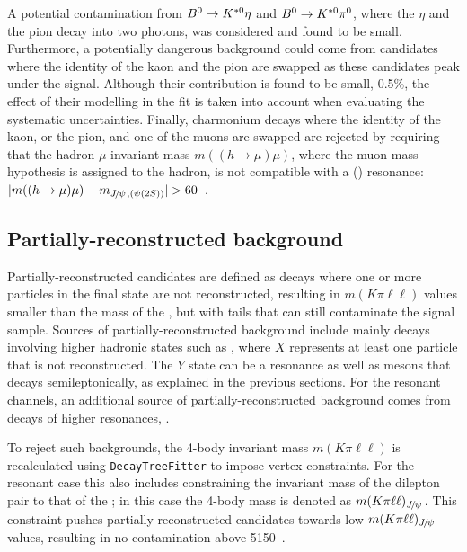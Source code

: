 A potential contamination from $\Bz \to\Kstarz\eta$ and $\Bz \to\Kstarz\pi^0$, where the $\eta$ and the pion decay into
two photons, was considered and found to be small.
Furthermore, a potentially dangerous background could come from candidates where the
identity of the kaon and the pion are swapped as these candidates peak under the signal.
Although their contribution is found to be small, 0.5\%, the effect of their modelling in the fit
is taken into account when evaluating the systematic uncertainties. Finally, charmonium decays where 
the identity of the kaon, or the pion, and one of the muons  are swapped are rejected by requiring that the 
hadron-$\mu$ invariant mass \mbox{$m((h \to \mu)\mu)$}, where the muon mass hypothesis is assigned to the hadron, 
is not compatible with a \jpsi (\psitwos) resonance: $|m((h\to \mu)\mu)-m_{\jpsi, (\psitwos)} | > 60$~\mevcc.

\subsection{Partially-reconstructed background}
\label{sec:RKst_peaking_Dchains}

Partially-reconstructed candidates are defined as decays where one or more particles in the final state are not reconstructed,
resulting in $m(K\pi\ell\ell)$ values smaller than the mass of the \Bz, but with tails that can still contaminate the signal sample.
Sources of partially-reconstructed background include mainly decays involving higher hadronic states such as 
, where $X$ represents at least one particle that is not reconstructed. 
The $Y$ state can be a \Kstar resonance as well as \D mesons that decays semileptonically, as explained in the previous sections.
For the resonant channels, an additional source of partially-reconstructed 
background comes from decays of higher \ccbar resonances, .

To reject such backgrounds, the 4-body invariant mass $m(K\pi\ell\ell)$ is recalculated using 
\verb!DecayTreeFitter! to impose vertex constraints. For the resonant case this also includes constraining the invariant 
mass of the dilepton pair to that of the \jpsi; in this case the 4-body mass is denoted as $m(K\pi\ell\ell)_{\jpsi}$. This constraint 
pushes partially-reconstructed candidates towards low $m(K\pi\ell\ell)_{\jpsi}$ values, resulting in no contamination above 5150~\mevcc. 

